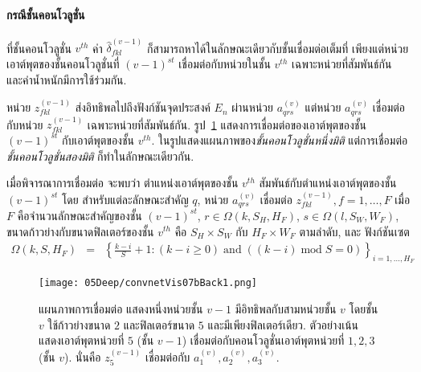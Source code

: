 \paragraph{กรณีชั้นคอนโวลูชั่น}
ที่ชั้นคอนโวลูชั่น $v^{th}$ ค่า $\hat{\delta}_{fkl}^{(v-1)}$  ก็สามารถหาได้ในลักษณะเดียวกับชั้นเชื่อมต่อเต็มที่ 
เพียงแต่หน่วยเอาต์พุตของชั้นคอนโวลูชั่นที่ $(v-1)^{st}$ เชื่อมต่อกับหน่วยในชั้น $v^{th}$ เฉพาะหน่วยที่สัมพันธ์กัน และค่าน้ำหนักมีการใช้ร่วมกัน.

หน่วย $z_{fkl}^{(v-1)}$ ส่งอิทธิพลไปถึงฟังก์ชันจุดประสงค์ $E_n$ ผ่านหน่วย $a_{qrs}^{(v)}$
แต่หน่วย $a_{qrs}^{(v)}$ เชื่อมต่อกับหน่วย $z_{fkl}^{(v-1)}$ เฉพาะหน่วยที่สัมพันธ์กัน.
%
รูป~\ref{fig: deep convolution back-credit} แสดงการเชื่อมต่อของเอาต์พุตของชั้น $(v-1)^{st}$ กับเอาต์พุตของชั้น $v^{th}$. ในรูปแสดงแผนภาพของ\textit{ชั้นคอนโวลูชั่นหนึ่งมิติ}
แต่การเชื่อมต่อ\textit{ชั้นคอนโวลูชั่นสองมิติ} ก็ทำในลักษณะเดียวกัน.

เมื่อพิจารณาการเชื่อมต่อ จะพบว่า
ตำแหน่งเอาต์พุตของชั้น $v^{th}$ สัมพันธ์กับตำแหน่งเอาต์พุตของชั้น $(v-1)^{st}$
โดย
สำหรับแต่ละลักษณะสำคัญ $q$,
หน่วย $a_{qrs}^{(v)}$ เชื่อมต่อ $z_{fkl}^{(v-1)}, f = 1, \ldots, F$
เมื่อ
$F$ คือจำนวนลักษณะสำคัญของชั้น $(v-1)^{st}$,
$r \in \Omega(k, S_H, H_F)$, 
$s \in \Omega(l, S_W, W_F)$,
ขนาดก้าวย่างกับขนาดฟิลเตอร์ของชั้น $v^{th}$ คือ $S_H \times S_W$ กับ $H_F \times W_F$ ตามลำดับ,
และ
ฟังก์ชันเซต 
\begin{eqnarray}
\Omega(k, S, H_F) & = & \left\{ \frac{k - i}{S} + 1: (k - i \geq 0) \;\mathrm{and}\; \left( (k - i) \;\mathrm{mod}\; S = 0 \right) \right\}_{i = 1, \ldots, H_F}
\label{eq: deep conv back r set}
\end{eqnarray}


%
\begin{figure}
	\begin{center}
		\texttt{[image: 05Deep/convnetVis07bBack1.png]}
		\caption[การแพร่กระจายย้อยกลับผ่านโครงสร้างการต่อเชื่อม]{แผนภาพการเชื่อมต่อ แสดงหนึ่งหน่วยชั้น $v-1$ มีอิทธิพลกับสามหน่วยชั้น $v$
			โดยชั้น $v$ ใช้ก้าวย่างขนาด $2$ และฟิลเตอร์ขนาด $5$ และมีเพียงฟิลเตอร์เดียว.
			ตัวอย่างเน้นแสดงเอาต์พุตหน่วยที่ $5$ (ชั้น $v-1$) เชื่อมต่อกับคอนโวลูชั่นเอาต์พุตหน่วยที่ $1, 2, 3$ (ชั้น $v$).
			นั่นคือ $z_5^{(v-1)}$ เชื่อมต่อกับ $a_1^{(v)}, a_2^{(v)}, a_3^{(v)}$.
		}
		\label{fig: deep convolution back-credit}
	\end{center}
\end{figure}
%

